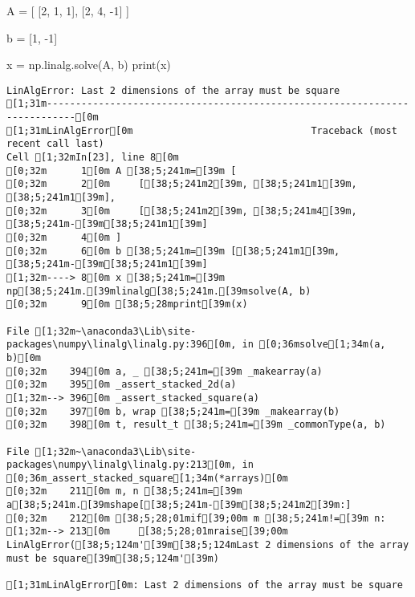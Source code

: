 \documentclass[
  letterpaper,
  DIV=11,
  numbers=noendperiod]{scrartcl}
\newenvironment{Shaded}{\begin{snugshade}}{\end{snugshade}}
\newcommand{\BuiltInTok}[1]{\textcolor[rgb]{0.00,0.23,0.31}{#1}}
\newcommand{\DecValTok}[1]{\textcolor[rgb]{0.68,0.00,0.00}{#1}}
\newcommand{\NormalTok}[1]{\textcolor[rgb]{0.00,0.23,0.31}{#1}}
\newcommand{\OperatorTok}[1]{\textcolor[rgb]{0.37,0.37,0.37}{#1}}
\begin{document}
\begin{Shaded}
\begin{Highlighting}[]

\NormalTok{A }\OperatorTok{=}\NormalTok{ [}
\NormalTok{    [}\DecValTok{2}\NormalTok{, }\DecValTok{1}\NormalTok{, }\DecValTok{1}\NormalTok{],}
\NormalTok{    [}\DecValTok{2}\NormalTok{, }\DecValTok{4}\NormalTok{, }\OperatorTok{{-}}\DecValTok{1}\NormalTok{]}
\NormalTok{]}

\NormalTok{b }\OperatorTok{=}\NormalTok{ [}\DecValTok{1}\NormalTok{, }\OperatorTok{{-}}\DecValTok{1}\NormalTok{]}

\NormalTok{x }\OperatorTok{=}\NormalTok{ np.linalg.solve(A, b)}
\BuiltInTok{print}\NormalTok{(x)}
\end{Highlighting}
\end{Shaded}

\begin{verbatim}
LinAlgError: Last 2 dimensions of the array must be square
[1;31m---------------------------------------------------------------------------[0m
[1;31mLinAlgError[0m                               Traceback (most recent call last)
Cell [1;32mIn[23], line 8[0m
[0;32m      1[0m A [38;5;241m=[39m [
[0;32m      2[0m     [[38;5;241m2[39m, [38;5;241m1[39m, [38;5;241m1[39m],
[0;32m      3[0m     [[38;5;241m2[39m, [38;5;241m4[39m, [38;5;241m-[39m[38;5;241m1[39m]
[0;32m      4[0m ]
[0;32m      6[0m b [38;5;241m=[39m [[38;5;241m1[39m, [38;5;241m-[39m[38;5;241m1[39m]
[1;32m----> 8[0m x [38;5;241m=[39m np[38;5;241m.[39mlinalg[38;5;241m.[39msolve(A, b)
[0;32m      9[0m [38;5;28mprint[39m(x)

File [1;32m~\anaconda3\Lib\site-packages\numpy\linalg\linalg.py:396[0m, in [0;36msolve[1;34m(a, b)[0m
[0;32m    394[0m a, _ [38;5;241m=[39m _makearray(a)
[0;32m    395[0m _assert_stacked_2d(a)
[1;32m--> 396[0m _assert_stacked_square(a)
[0;32m    397[0m b, wrap [38;5;241m=[39m _makearray(b)
[0;32m    398[0m t, result_t [38;5;241m=[39m _commonType(a, b)

File [1;32m~\anaconda3\Lib\site-packages\numpy\linalg\linalg.py:213[0m, in [0;36m_assert_stacked_square[1;34m(*arrays)[0m
[0;32m    211[0m m, n [38;5;241m=[39m a[38;5;241m.[39mshape[[38;5;241m-[39m[38;5;241m2[39m:]
[0;32m    212[0m [38;5;28;01mif[39;00m m [38;5;241m!=[39m n:
[1;32m--> 213[0m     [38;5;28;01mraise[39;00m LinAlgError([38;5;124m'[39m[38;5;124mLast 2 dimensions of the array must be square[39m[38;5;124m'[39m)

[1;31mLinAlgError[0m: Last 2 dimensions of the array must be square
\end{verbatim}
\end{document}
